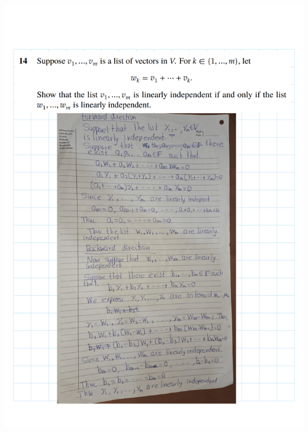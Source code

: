 \documentclass[
]{book}
\theoremstyle{definition}
\theoremstyle{definition}
\theoremstyle{definition}
\theoremstyle{definition}
\theoremstyle{remark}
\begin{document}
\includegraphics{fig/Ex2A/Ex2A-17.png}
\end{document}
